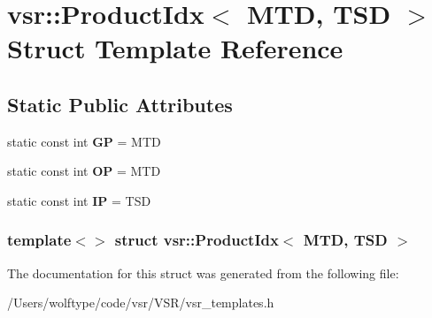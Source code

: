 \hypertarget{structvsr_1_1_product_idx_3_01_m_t_d_00_01_t_s_d_01_4}{\section{vsr\-:\-:Product\-Idx$<$ M\-T\-D, T\-S\-D $>$ Struct Template Reference}
\label{structvsr_1_1_product_idx_3_01_m_t_d_00_01_t_s_d_01_4}
}
\subsection*{Static Public Attributes}
\begin{DoxyCompactItemize}
\item 
\hypertarget{structvsr_1_1_product_idx_3_01_m_t_d_00_01_t_s_d_01_4_a869bf67e937f89216220b621d995fe52}{static const int {\bfseries G\-P} = M\-T\-D}\label{structvsr_1_1_product_idx_3_01_m_t_d_00_01_t_s_d_01_4_a869bf67e937f89216220b621d995fe52}

\item 
\hypertarget{structvsr_1_1_product_idx_3_01_m_t_d_00_01_t_s_d_01_4_add117f1bab9d57a5768204a617d8e926}{static const int {\bfseries O\-P} = M\-T\-D}\label{structvsr_1_1_product_idx_3_01_m_t_d_00_01_t_s_d_01_4_add117f1bab9d57a5768204a617d8e926}

\item 
\hypertarget{structvsr_1_1_product_idx_3_01_m_t_d_00_01_t_s_d_01_4_ac08c9e0fb40711be4b53b834601480f6}{static const int {\bfseries I\-P} = T\-S\-D}\label{structvsr_1_1_product_idx_3_01_m_t_d_00_01_t_s_d_01_4_ac08c9e0fb40711be4b53b834601480f6}

\end{DoxyCompactItemize}
\subsubsection*{template$<$$>$ struct vsr\-::\-Product\-Idx$<$ M\-T\-D, T\-S\-D $>$}



The documentation for this struct was generated from the following file\-:\begin{DoxyCompactItemize}
\item 
/\-Users/wolftype/code/vsr/\-V\-S\-R/vsr\-\_\-templates.\-h\end{DoxyCompactItemize}
